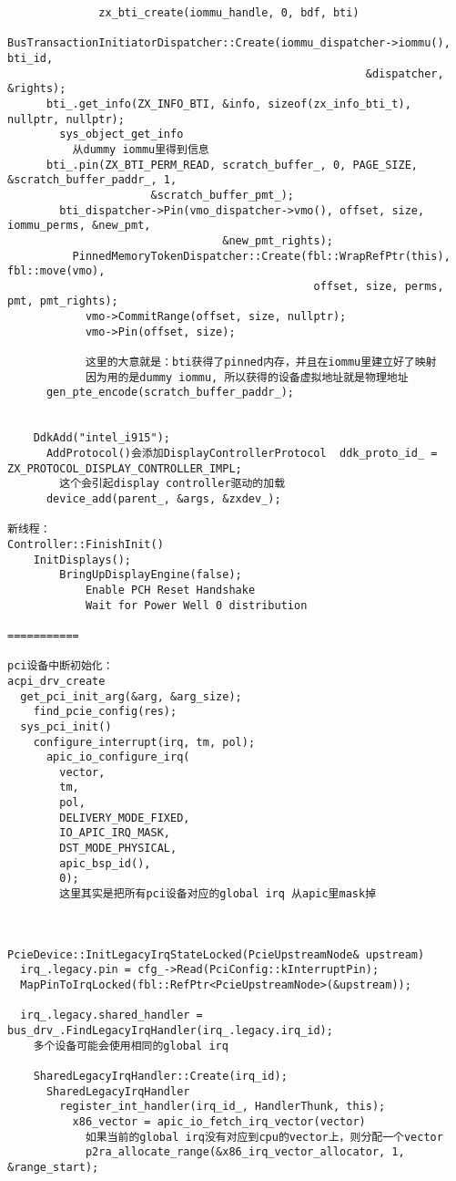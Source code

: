 \begin{verbatim}
              zx_bti_create(iommu_handle, 0, bdf, bti)
                BusTransactionInitiatorDispatcher::Create(iommu_dispatcher->iommu(), bti_id,
                                                       &dispatcher, &rights);
      bti_.get_info(ZX_INFO_BTI, &info, sizeof(zx_info_bti_t), nullptr, nullptr);
        sys_object_get_info
          从dummy iommu里得到信息
      bti_.pin(ZX_BTI_PERM_READ, scratch_buffer_, 0, PAGE_SIZE, &scratch_buffer_paddr_, 1,
                      &scratch_buffer_pmt_);
        bti_dispatcher->Pin(vmo_dispatcher->vmo(), offset, size, iommu_perms, &new_pmt,
                                 &new_pmt_rights);
          PinnedMemoryTokenDispatcher::Create(fbl::WrapRefPtr(this), fbl::move(vmo),
                                               offset, size, perms, pmt, pmt_rights);                                    
            vmo->CommitRange(offset, size, nullptr);
            vmo->Pin(offset, size);

            这里的大意就是：bti获得了pinned内存，并且在iommu里建立好了映射
            因为用的是dummy iommu, 所以获得的设备虚拟地址就是物理地址
      gen_pte_encode(scratch_buffer_paddr_);


    DdkAdd("intel_i915");
      AddProtocol()会添加DisplayControllerProtocol  ddk_proto_id_ = ZX_PROTOCOL_DISPLAY_CONTROLLER_IMPL;
        这个会引起display controller驱动的加载
      device_add(parent_, &args, &zxdev_);

新线程：
Controller::FinishInit()
    InitDisplays();
        BringUpDisplayEngine(false);
            Enable PCH Reset Handshake
            Wait for Power Well 0 distribution

===========

pci设备中断初始化：
acpi_drv_create
  get_pci_init_arg(&arg, &arg_size);
    find_pcie_config(res);
  sys_pci_init()
    configure_interrupt(irq, tm, pol);
      apic_io_configure_irq(
        vector,
        tm,
        pol,
        DELIVERY_MODE_FIXED,
        IO_APIC_IRQ_MASK,
        DST_MODE_PHYSICAL,
        apic_bsp_id(),
        0);
        这里其实是把所有pci设备对应的global irq 从apic里mask掉
  


PcieDevice::InitLegacyIrqStateLocked(PcieUpstreamNode& upstream)
  irq_.legacy.pin = cfg_->Read(PciConfig::kInterruptPin);
  MapPinToIrqLocked(fbl::RefPtr<PcieUpstreamNode>(&upstream));

  irq_.legacy.shared_handler = bus_drv_.FindLegacyIrqHandler(irq_.legacy.irq_id);
    多个设备可能会使用相同的global irq

    SharedLegacyIrqHandler::Create(irq_id);
      SharedLegacyIrqHandler
        register_int_handler(irq_id_, HandlerThunk, this);
          x86_vector = apic_io_fetch_irq_vector(vector)
            如果当前的global irq没有对应到cpu的vector上，则分配一个vector
            p2ra_allocate_range(&x86_irq_vector_allocator, 1, &range_start);

            
\end{verbatim}